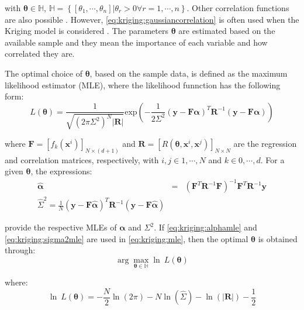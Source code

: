 			\noindent with $\boldsymbol{\theta} \in \mathbb{H}$, $\mathbb{H} = \left\{[\theta_1,\cdots,\theta_n]|\theta_r>0\forall r=1,\cdots,n\right\}$. Other correlation functions are also possible \citep{sacks1989design,mackay1998introduction}. However, \eqref{eq:kriging:gaussiancorrelation} is often used when the Kriging model is considered \citep{jin2005comprehensive,zhao2011metamodeling}. The parameters $\boldsymbol{\theta}$ are estimated based on the available sample and they mean the importance of each variable and how correlated they are.
			
			The optimal choice of $\boldsymbol{\theta}$, based on the sample data, is defined as the maximum likelihood estimator (MLE), where the likelihood funnction has the following form:
			\begin{equation}
				L(\boldsymbol{\theta}) = \frac{1}{\sqrt{(2\pi\Sigma^2)^N|\mathbf{R}|}}\mathrm{exp}\left(-\frac{1}{2\Sigma^2}(\mathbf{y}-\mathbf{F}\boldsymbol{\alpha})^T\mathbf{R}^{-1}(\mathbf{y}-\mathbf{F}\boldsymbol{\alpha})\right) \label{eq:kriging:mle}
			\end{equation}
		
			\noindent where $\mathbf{F}=[f_k(\mathbf{x}^i)]_{N\times(d+1)}$ and $\mathbf{R} = [R(\boldsymbol{\theta},\mathbf{x}^i,\mathbf{x}^j)]_{N\times N}$ are the regression and correlation matrices, respectively, with $i,j\in {1,\cdots, N}$ and $k\in {0,\cdots,d}$. For a given $\boldsymbol{\theta}$, the expressions:
			\begin{eqnarray}
				\boldsymbol{\hat{\alpha}} &=& \left(\mathbf{F}^T\mathbf{R}^{-1}\mathbf{F}\right)^{-1}\mathbf{F}^T\mathbf{R}^{-1}\mathbf{y} \label{eq:kriging:alphamle} \\
				\hat{\Sigma}^2 = \frac{1}{N} \left(\mathbf{y}-\mathbf{F}\boldsymbol{\hat{\alpha}}\right)^T\mathbf{R}^{-1}(\mathbf{y}-\mathbf{F}\boldsymbol{\hat{\alpha}}) \label{eq:kriging:sigma2mle}
			\end{eqnarray}
		
			\noindent provide the respective MLEs of $\boldsymbol{\alpha}$ and $\Sigma^2$. If \eqref{eq:kriging:alphamle} and \eqref{eq:kriging:sigma2mle} are used in \eqref{eq:kriging:mle}, then the optimal $\boldsymbol{\theta}$ is obtained through:
			\begin{equation}
				\arg\max\limits_{\boldsymbol{\theta}\in \mathbb{H}} \ln~L(\boldsymbol{\theta}) \label{eq:kriging:optimization}
			\end{equation}
		
			\noindent where:
			\begin{equation}
				\ln~L(\boldsymbol{\theta}) = -\frac{N}{2}\ln(2\pi) - N\ln(\hat{\Sigma}) - \ln(|\mathbf{R}|) - \frac{1}{2}
			\end{equation}
		

